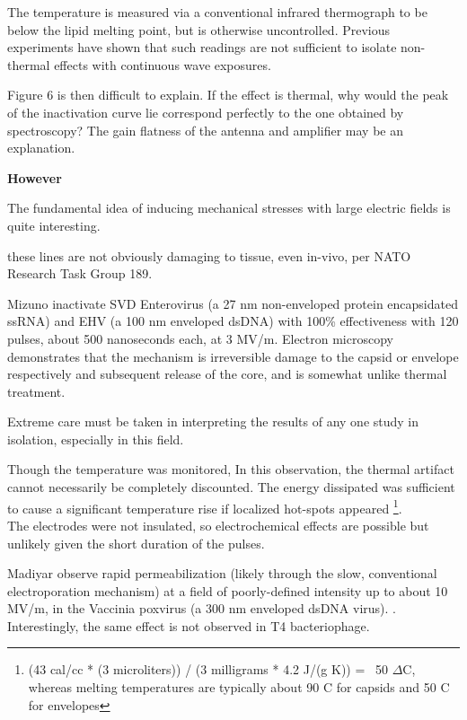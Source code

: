 \documentclass[fleqn,10pt]{paper}
\begin{document}
The temperature is measured via a conventional infrared thermograph to be below the lipid melting point, but is otherwise uncontrolled. Previous experiments have shown that such readings are not sufficient to isolate non-thermal effects with continuous wave exposures. 

Figure 6 is then difficult to explain. If the effect is thermal, why would the peak of the inactivation curve lie correspond perfectly to the one obtained by spectroscopy? The gain flatness of the antenna and amplifier may be an explanation.


{\Huge \textbf{However}}

The fundamental idea of inducing mechanical stresses with large electric fields is quite interesting.

these lines are not obviously damaging to tissue, even in-vivo, per NATO 
Research Task Group 189.

Mizuno \cite{Inactivation1990} inactivate SVD Enterovirus (a 27 nm non-enveloped protein encapsidated ssRNA) and EHV (a 100 nm enveloped dsDNA) with 100\% effectiveness with 120 pulses, about 500 nanoseconds each, at 3 MV/m. Electron microscopy demonstrates that the mechanism is irreversible damage to the capsid or envelope respectively and subsequent release of the core, and is somewhat unlike thermal treatment.

\begin{autem}
	Extreme care must be taken in interpreting the results of any one study in isolation, especially in this field. 
	
	Though the temperature was monitored, In this observation, the thermal artifact cannot necessarily be completely discounted. The energy dissipated was sufficient to cause a significant temperature rise if localized hot-spots appeared \footnote{(43 cal/cc * (3 microliters)) / (3 milligrams * 4.2 J/(g K)) = ~50 $\Delta$C, whereas melting temperatures are typically about 90 C for capsids \cite{Thermal1999} and 50 C for envelopes\cite{Stability1985}}. \\ The electrodes were not insulated, so electrochemical effects are possible but unlikely given the short duration of the pulses. 
\end{autem}

Madiyar \cite{Manipulation2013} observe rapid permeabilization (likely through the slow, conventional electroporation mechanism) at a field of poorly-defined intensity up to about 10 MV/m, in the Vaccinia poxvirus (a 300 nm enveloped dsDNA virus). \cite{AC2017}. Interestingly, the same effect is not observed in T4 bacteriophage. 
\end{document}
